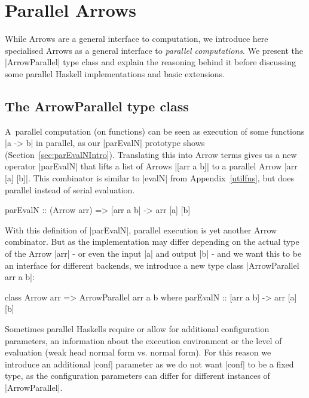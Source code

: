 \section{Parallel Arrows}
\label{sec:parallel-arrows}
While Arrows are a general interface to computation, we introduce here specialised Arrows as a general interface to \textit{parallel computations}. We present the |ArrowParallel| type class and explain the reasoning behind it before discussing some parallel Haskell implementations and basic extensions.
\subsection{The ArrowParallel type class}
A~parallel computation (on functions) can be seen as execution of some functions |a -> b| in parallel, as our |parEvalN| prototype shows (Section~\ref{sec:parEvalNIntro}).
Translating this into Arrow terms gives us a new operator |parEvalN| that lifts a list of Arrows |[arr a b]| to a parallel Arrow |arr [a] [b]|. %
This combinator is similar to |evalN| from Appendix~\ref{utilfns}, but does parallel instead of serial evaluation.
\begin{code}
parEvalN :: (Arrow arr) => [arr a b] -> arr [a] [b]
\end{code}
With this definition of |parEvalN|, parallel execution is yet another Arrow combinator. But as the implementation may differ depending on the actual type of the Arrow |arr| - or even the input |a| and output |b| - and we want this to be an interface for different backends, we introduce a new type class |ArrowParallel arr a b|: %
\begin{code}
class Arrow arr => ArrowParallel arr a b where
	parEvalN :: [arr a b] -> arr [a] [b]
\end{code}
Sometimes parallel Haskells require or allow for additional configuration parameters, \eg an information about the execution environment or the level of evaluation (weak head normal form vs. normal form). For this reason we introduce an additional |conf| parameter as we do not want |conf| to be a fixed type, as the configuration parameters can differ for different instances of |ArrowParallel|. %
